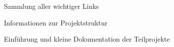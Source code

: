 \begin{frame}
	
\begin{block}{}
	Sammlung aller wichtiger Links
\end{block}
\begin{block}{}
	Informationen zur Projektstruktur
\end{block}
\begin{block}{}
	Einführung und kleine Dokumentation der Teilprojekte
\end{block}

\end{frame}